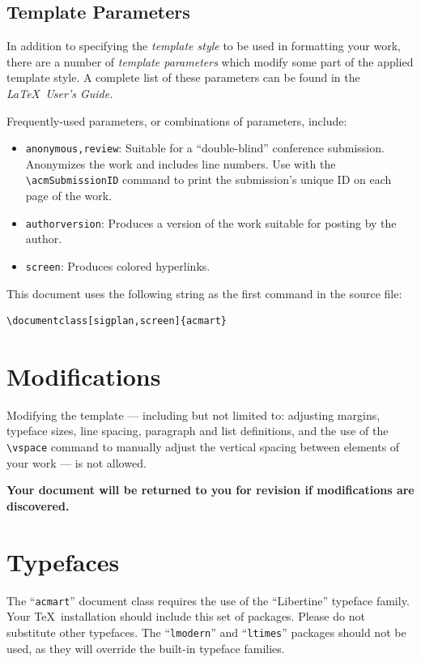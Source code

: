 \documentclass[sigplan,screen]{acmart}
\begin{document}
\subsection{Template Parameters}

In addition to specifying the {\itshape template style} to be used in
formatting your work, there are a number of {\itshape template parameters}
which modify some part of the applied template style. A complete list
of these parameters can be found in the {\itshape \LaTeX\ User's Guide.}

Frequently-used parameters, or combinations of parameters, include:
\begin{itemize}
	\item {\verb|anonymous,review|}: Suitable for a ``double-blind''
	      conference submission. Anonymizes the work and includes line
	      numbers. Use with the \verb|\acmSubmissionID| command to print the
	      submission's unique ID on each page of the work.
	\item{\verb|authorversion|}: Produces a version of the work suitable
	      for posting by the author.
	\item{\verb|screen|}: Produces colored hyperlinks.
\end{itemize}

This document uses the following string as the first command in the
source file:
\begin{verbatim}
\documentclass[sigplan,screen]{acmart}
\end{verbatim}

\section{Modifications}

Modifying the template --- including but not limited to: adjusting
margins, typeface sizes, line spacing, paragraph and list definitions,
and the use of the \verb|\vspace| command to manually adjust the
vertical spacing between elements of your work --- is not allowed.

	{\bfseries Your document will be returned to you for revision if
		modifications are discovered.}

\section{Typefaces}

The ``\verb|acmart|'' document class requires the use of the
``Libertine'' typeface family. Your \TeX\ installation should include
this set of packages. Please do not substitute other typefaces. The
``\verb|lmodern|'' and ``\verb|ltimes|'' packages should not be used,
as they will override the built-in typeface families.
\end{document}
